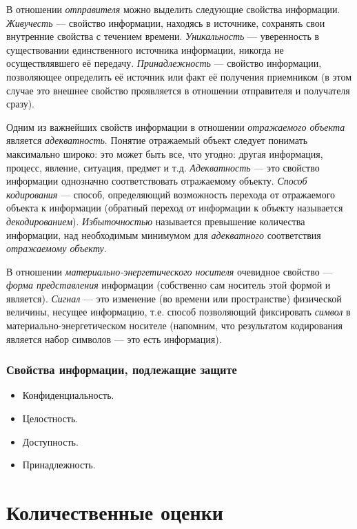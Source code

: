 В отношении \emph{отправителя} можно выделить следующие свойства информации. \emph{Живучесть} --- свойство информации, находясь в источнике, сохранять свои внутренние свойства с течением времени. \emph{Уникальность} --- уверенность в существовании единственного источника информации, никогда не осуществлявшего её передачу. \emph{Принадлежность} --- свойство информации, позволяющее определить её источник или факт её получения приемником (в этом случае это внешнее свойство проявляется в отношении отправителя и получателя сразу).

Одним из важнейших свойств информации в отношении \emph{отражаемого объекта} является \emph{адекватность}. Понятие отражаемый объект следует понимать максимально широко: это может быть все, что угодно: другая информация, процесс, явление, ситуация, предмет и т.д.  \emph{Адекватность} --- это свойство информации однозначно соответствовать отражаемому объекту. \emph{Способ кодирования} --- способ, определяющий возможность перехода от отражаемого объекта к информации (обратный переход от информации к объекту называется \emph{декодированием}). \emph{Избыточностью} называется превышение количества информации, над необходимым минимумом для \emph{адекватного} соответствия \emph{отражаемому объекту}.

В отношении \emph{материально-энергетического носителя} очевидное свойство --- \emph{форма представления} информации (собственно сам носитель этой формой и является). \emph{Сигнал} --- это изменение (во времени или пространстве) физической величины, несущее информацию, т.е.  способ позволяющий фиксировать \emph{символ} в материально-энергетическом носителе (напомним, что результатом кодирования является набор символов --- это есть информация). 


\begin{frame}
\frametitle{Свойства информации, подлежащие защите}
\begin{itemize}
    \item \alert{Конфиденциальность}.
    \item \alert{Целостность}.
    \item \alert{Доступность}.
    \item \alert{Принадлежность}.
\end{itemize} 
\end{frame}



\section{Количественные оценки}

